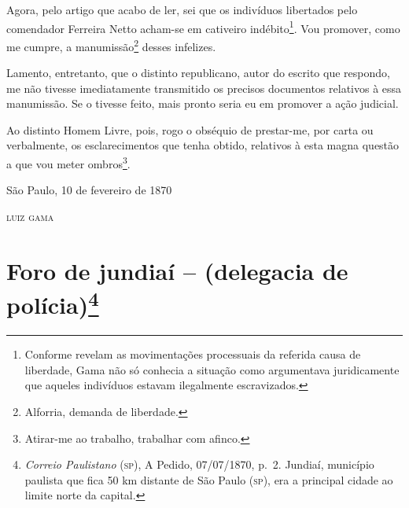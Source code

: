 Agora, pelo artigo que acabo de ler, sei que os indivíduos libertados
pelo comendador Ferreira Netto acham-se em cativeiro
indébito\footnote{ Conforme revelam as movimentações processuais da
  referida causa de liberdade, Gama não só conhecia a situação como
  argumentava juridicamente que aqueles indivíduos estavam ilegalmente
  escravizados.}. Vou promover, como me cumpre, a manumissão\footnote{
  Alforria, demanda de liberdade.} desses infelizes.

Lamento, entretanto, que o distinto republicano, autor do escrito que
respondo, me não tivesse imediatamente transmitido os precisos
documentos relativos à essa manumissão. Se o tivesse feito, mais pronto
seria eu em promover a ação judicial.

Ao distinto Homem Livre, pois, rogo o obséquio de prestar-me, por carta
ou verbalmente, os esclarecimentos que tenha obtido, relativos à esta
magna questão a que vou meter ombros\footnote{ Atirar-me ao trabalho,
  trabalhar com afinco.}.

\begin{flushright}
São Paulo, 10 de fevereiro de 1870

\textsc{luiz gama}
\end{flushright}

\chapter{Foro de jundiaí -- (delegacia de polícia)\footnote{\emph{Correio Paulistano} (\textsc{sp}), A Pedido, 07/07/1870,
  p.~2. Jundiaí, município paulista que fica 50 km distante de São Paulo
  (\textsc{sp}), era a principal cidade ao limite norte da capital.}} %

